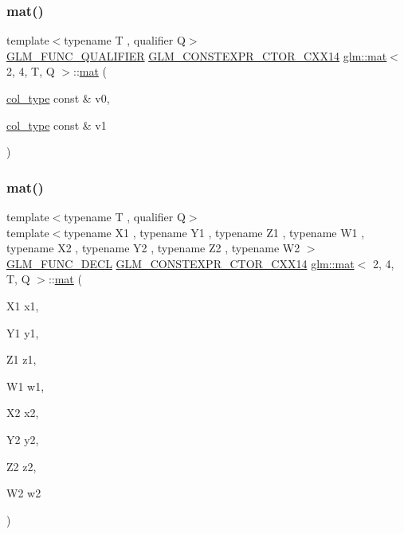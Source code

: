 \subsubsection{\texorpdfstring{mat()}{mat()}\hspace{0.1cm}{\footnotesize\ttfamily [6/21]}}
{\footnotesize\ttfamily template$<$typename T , qualifier Q$>$ \\
\mbox{\hyperlink{setup_8hpp_a33fdea6f91c5f834105f7415e2a64407}{G\+L\+M\+\_\+\+F\+U\+N\+C\+\_\+\+Q\+U\+A\+L\+I\+F\+I\+ER}} \mbox{\hyperlink{setup_8hpp_a0900f9145e68bf6061b6f5e7be3fa751}{G\+L\+M\+\_\+\+C\+O\+N\+S\+T\+E\+X\+P\+R\+\_\+\+C\+T\+O\+R\+\_\+\+C\+X\+X14}} \mbox{\hyperlink{structglm_1_1mat}{glm\+::mat}}$<$ 2, 4, T, Q $>$\+::\mbox{\hyperlink{structglm_1_1mat}{mat}} (\begin{DoxyParamCaption}\item[{\mbox{\hyperlink{structglm_1_1mat_3_012_00_014_00_01_t_00_01_q_01_4_ae14ad10a9d8ce3908ec89ae373a27872}{col\+\_\+type}} const \&}]{v0,  }\item[{\mbox{\hyperlink{structglm_1_1mat_3_012_00_014_00_01_t_00_01_q_01_4_ae14ad10a9d8ce3908ec89ae373a27872}{col\+\_\+type}} const \&}]{v1 }\end{DoxyParamCaption})}

\mbox{\label{structglm_1_1mat_3_012_00_014_00_01_t_00_01_q_01_4_a1002bf14f10af4be0f43476891c61fe9}} 
\subsubsection{\texorpdfstring{mat()}{mat()}\hspace{0.1cm}{\footnotesize\ttfamily [7/21]}}
{\footnotesize\ttfamily template$<$typename T , qualifier Q$>$ \\
template$<$typename X1 , typename Y1 , typename Z1 , typename W1 , typename X2 , typename Y2 , typename Z2 , typename W2 $>$ \\
\mbox{\hyperlink{setup_8hpp_ab2d052de21a70539923e9bcbf6e83a51}{G\+L\+M\+\_\+\+F\+U\+N\+C\+\_\+\+D\+E\+CL}} \mbox{\hyperlink{setup_8hpp_a0900f9145e68bf6061b6f5e7be3fa751}{G\+L\+M\+\_\+\+C\+O\+N\+S\+T\+E\+X\+P\+R\+\_\+\+C\+T\+O\+R\+\_\+\+C\+X\+X14}} \mbox{\hyperlink{structglm_1_1mat}{glm\+::mat}}$<$ 2, 4, T, Q $>$\+::\mbox{\hyperlink{structglm_1_1mat}{mat}} (\begin{DoxyParamCaption}\item[{X1}]{x1,  }\item[{Y1}]{y1,  }\item[{Z1}]{z1,  }\item[{W1}]{w1,  }\item[{X2}]{x2,  }\item[{Y2}]{y2,  }\item[{Z2}]{z2,  }\item[{W2}]{w2 }\end{DoxyParamCaption})}

